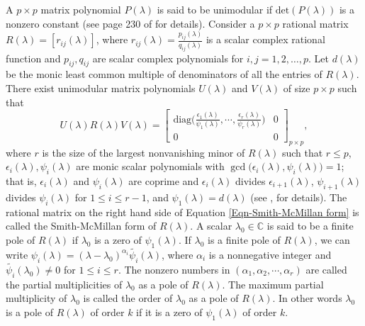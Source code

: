 \documentclass[12pt, reqno]{amsart}
\theoremstyle{definition}
\theoremstyle{remark}
\numberwithin{equation}{section}
\begin{document}
\medskip
A $p \times p$ matrix polynomial $P(\lambda)$ is said to be unimodular 
if $\text{det}(P(\lambda))$ is a nonzero constant (see page 230 of \cite{Gohberg} for details). Consider 
a $p\times p$ rational matrix $R(\lambda)=[r_{ij}(\lambda)]$,  where $\displaystyle r_{ij}(\lambda) = 
\frac{p_{ij}(\lambda)}{q_{ij}(\lambda)}$ is a scalar complex rational function and 
$p_{ij}, q_{ij}$ are scalar complex polynomials for $i,j=1,2,\ldots,p$. Let 
$d(\lambda)$ be the monic least common multiple of denominators of all the entries 
of $R(\lambda)$. There exist unimodular matrix polynomials $U(\lambda)$ and 
$V(\lambda)$ of size $p\times p$ such that 
\begin{equation} \label{Eqn-Smith-McMillan form}
U(\lambda) R(\lambda) V(\lambda) = \begin{bmatrix}
\displaystyle \text{diag}\bigg(\frac{\epsilon_1(\lambda)}{\psi_1(\lambda)},\cdots,
\frac{\epsilon_r(\lambda)}{\psi_r(\lambda)}\bigg) & 0 \\
0 & 0
\end{bmatrix}_{p\times p},
\end{equation}
where $r$ is the size of the largest nonvanishing minor of $R(\lambda)$ such that 
$r \leq p$, $\epsilon_i(\lambda), \psi_i(\lambda)$ are monic scalar polynomials 
with $\gcd\textbf{(}\epsilon_i(\lambda), \psi_i(\lambda)\textbf{)} =1$; that is, 
$ \epsilon_i(\lambda)$ and $\psi_i(\lambda)$ are coprime and $\epsilon_i(\lambda)$ 
divides $\epsilon_{i+1}(\lambda)$, $\psi_{i+1}(\lambda)$ divides $ \psi_i(\lambda)$ 
for $1 \leq i \leq r-1$, and $\psi_1(\lambda) = d(\lambda)$ (see \cite{Rosenbrock}, 
\cite{Amparan-Dopico} for details). The rational matrix on the right hand side of 
Equation \eqref{Eqn-Smith-McMillan form} is called the Smith-McMillan form of 
$R(\lambda)$. A scalar $\lambda_0 \in \mathbb{C}$ is said to be a finite pole of 
$R(\lambda)$ if $\lambda_0$ is a zero of $\psi_1(\lambda)$. If $\lambda_0$ is a 
finite pole of $R(\lambda)$, we can write 
$\psi_i(\lambda) = (\lambda - \lambda_0)^{\alpha_i} \widetilde{\psi_i}(\lambda)$, 
where $\alpha_i$ is a nonnegative integer and $\widetilde{\psi_i}(\lambda_0) \neq 0$ 
for $1\leq i \leq r$. The nonzero numbers in $(\alpha_1,\alpha_2,\cdots,\alpha_r)$ 
are called the partial multiplicities of $\lambda_0$ as a pole of $R(\lambda)$.  
The maximum partial multiplicity of $\lambda_0$ is called the order 
of $\lambda_0$ as a pole of $R(\lambda)$. In other words $\lambda_0$ is a pole of 
$R(\lambda)$ of order $k$ if it is a zero of $\psi_1(\lambda)$ of order $k$.
\end{document}
